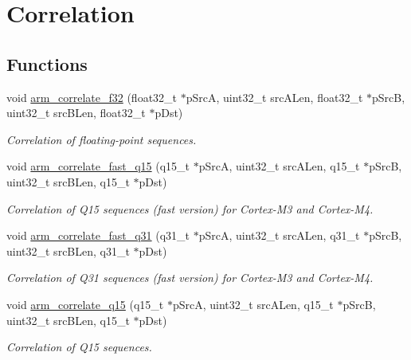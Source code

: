\hypertarget{group___corr}{\section{Correlation}
\label{group___corr}
}
\subsection*{Functions}
\begin{DoxyCompactItemize}
\item 
void \hyperlink{group___corr_ga22021e4222773f01e9960358a531cfb8}{arm\-\_\-correlate\-\_\-f32} (float32\-\_\-t $\ast$p\-Src\-A, uint32\-\_\-t src\-A\-Len, float32\-\_\-t $\ast$p\-Src\-B, uint32\-\_\-t src\-B\-Len, float32\-\_\-t $\ast$p\-Dst)
\begin{DoxyCompactList}\small\item\em Correlation of floating-\/point sequences. \end{DoxyCompactList}\item 
void \hyperlink{group___corr_gac8de3da44f58e86c2c86156276ca154f}{arm\-\_\-correlate\-\_\-fast\-\_\-q15} (q15\-\_\-t $\ast$p\-Src\-A, uint32\-\_\-t src\-A\-Len, q15\-\_\-t $\ast$p\-Src\-B, uint32\-\_\-t src\-B\-Len, q15\-\_\-t $\ast$p\-Dst)
\begin{DoxyCompactList}\small\item\em Correlation of Q15 sequences (fast version) for Cortex-\/\-M3 and Cortex-\/\-M4. \end{DoxyCompactList}\item 
void \hyperlink{group___corr_gabecd3d7b077dbbef43f93e9e037815ed}{arm\-\_\-correlate\-\_\-fast\-\_\-q31} (q31\-\_\-t $\ast$p\-Src\-A, uint32\-\_\-t src\-A\-Len, q31\-\_\-t $\ast$p\-Src\-B, uint32\-\_\-t src\-B\-Len, q31\-\_\-t $\ast$p\-Dst)
\begin{DoxyCompactList}\small\item\em Correlation of Q31 sequences (fast version) for Cortex-\/\-M3 and Cortex-\/\-M4. \end{DoxyCompactList}\item 
void \hyperlink{group___corr_ga5ec96b8e420d68b0e626df0812274d46}{arm\-\_\-correlate\-\_\-q15} (q15\-\_\-t $\ast$p\-Src\-A, uint32\-\_\-t src\-A\-Len, q15\-\_\-t $\ast$p\-Src\-B, uint32\-\_\-t src\-B\-Len, q15\-\_\-t $\ast$p\-Dst)
\begin{DoxyCompactList}\small\item\em Correlation of Q15 sequences. \end{DoxyCompactList}\item 

\end{DoxyCompactItemize}

